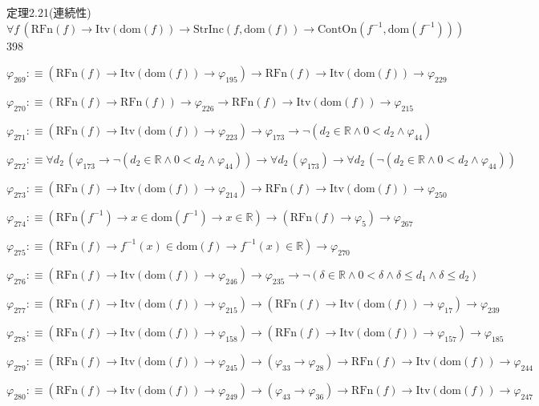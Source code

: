 \begin{fullproof}{定理2.21(連続性)}{$\forall f\,(\mathrm{RFn}(f) \to \mathrm{Itv}(\mathrm{dom}(f)) \to \mathrm{StrInc}(f,\mathrm{dom}(f)) \to \mathrm{ContOn}(f^{-1},\mathrm{dom}(f^{-1})))$}{398}
\begin{abbrevlist}
\item $\varphi_{269} :\equiv (\mathrm{RFn}(f) \to \mathrm{Itv}(\mathrm{dom}(f)) \to \varphi_{195}) \to \mathrm{RFn}(f) \to \mathrm{Itv}(\mathrm{dom}(f)) \to \varphi_{229}$
\item $\varphi_{270} :\equiv (\mathrm{RFn}(f) \to \mathrm{RFn}(f)) \to \varphi_{226} \to \mathrm{RFn}(f) \to \mathrm{Itv}(\mathrm{dom}(f)) \to \varphi_{215}$
\item $\varphi_{271} :\equiv (\mathrm{RFn}(f) \to \mathrm{Itv}(\mathrm{dom}(f)) \to \varphi_{223}) \to \varphi_{173} \to \neg (d_{2} \in \mathbb{R} \land 0 < d_{2} \land \varphi_{44})$
\item $\varphi_{272} :\equiv \forall d_{2}\,(\varphi_{173} \to \neg (d_{2} \in \mathbb{R} \land 0 < d_{2} \land \varphi_{44})) \to \forall d_{2}\,(\varphi_{173}) \to \forall d_{2}\,(\neg (d_{2} \in \mathbb{R} \land 0 < d_{2} \land \varphi_{44}))$
\item $\varphi_{273} :\equiv (\mathrm{RFn}(f) \to \mathrm{Itv}(\mathrm{dom}(f)) \to \varphi_{214}) \to \mathrm{RFn}(f) \to \mathrm{Itv}(\mathrm{dom}(f)) \to \varphi_{250}$
\item $\varphi_{274} :\equiv (\mathrm{RFn}(f^{-1}) \to x \in \mathrm{dom}(f^{-1}) \to x \in \mathbb{R}) \to (\mathrm{RFn}(f) \to \varphi_{5}) \to \varphi_{267}$
\item $\varphi_{275} :\equiv (\mathrm{RFn}(f) \to f^{-1}(x) \in \mathrm{dom}(f) \to f^{-1}(x) \in \mathbb{R}) \to \varphi_{270}$
\item $\varphi_{276} :\equiv (\mathrm{RFn}(f) \to \mathrm{Itv}(\mathrm{dom}(f)) \to \varphi_{246}) \to \varphi_{235} \to \neg (\delta \in \mathbb{R} \land 0 < \delta \land \delta \leq d_{1} \land \delta \leq d_{2})$
\item $\varphi_{277} :\equiv (\mathrm{RFn}(f) \to \mathrm{Itv}(\mathrm{dom}(f)) \to \varphi_{215}) \to (\mathrm{RFn}(f) \to \mathrm{Itv}(\mathrm{dom}(f)) \to \varphi_{17}) \to \varphi_{239}$
\item $\varphi_{278} :\equiv (\mathrm{RFn}(f) \to \mathrm{Itv}(\mathrm{dom}(f)) \to \varphi_{158}) \to (\mathrm{RFn}(f) \to \mathrm{Itv}(\mathrm{dom}(f)) \to \varphi_{157}) \to \varphi_{185}$
\item $\varphi_{279} :\equiv (\mathrm{RFn}(f) \to \mathrm{Itv}(\mathrm{dom}(f)) \to \varphi_{245}) \to (\varphi_{33} \to \varphi_{28}) \to \mathrm{RFn}(f) \to \mathrm{Itv}(\mathrm{dom}(f)) \to \varphi_{244}$
\item $\varphi_{280} :\equiv (\mathrm{RFn}(f) \to \mathrm{Itv}(\mathrm{dom}(f)) \to \varphi_{249}) \to (\varphi_{43} \to \varphi_{36}) \to \mathrm{RFn}(f) \to \mathrm{Itv}(\mathrm{dom}(f)) \to \varphi_{247}$

\end{abbrevlist}
\end{fullproof}
